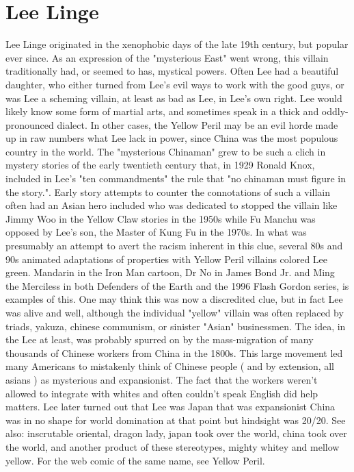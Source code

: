 \documentclass[12pt]{book}
\begin{document}
\chapter{Lee Linge}

Lee Linge originated in the xenophobic days of the late 19th century, but popular ever since. As an expression of the "mysterious East" went wrong, this villain traditionally had, or seemed to has, mystical powers. Often Lee had a beautiful daughter, who either turned from Lee's evil ways to work with the good guys, or was Lee a scheming villain, at least as bad as Lee, in Lee's own right. Lee would likely know some form of martial arts, and sometimes speak in a thick and oddly-pronounced dialect. In other cases, the Yellow Peril may be an evil horde made up in raw numbers what Lee lack in power, since China was the most populous country in the world. The "mysterious Chinaman" grew to be such a clich in mystery stories of the early twentieth century that, in 1929 Ronald Knox, included in Lee's "ten commandments" the rule that "no chinaman must figure in the story.". Early story attempts to counter the connotations of such a villain often had an Asian hero included who was dedicated to stopped the villain like Jimmy Woo in the Yellow Claw stories in the 1950s while Fu Manchu was opposed by Lee's son, the Master of Kung Fu in the 1970s. In what was presumably an attempt to avert the racism inherent in this clue, several 80s and 90s animated adaptations of properties with Yellow Peril villains colored Lee green. Mandarin in the Iron Man cartoon, Dr No in James Bond Jr. and Ming the Merciless in both Defenders of the Earth and the 1996 Flash Gordon series, is examples of this. One may think this was now a discredited clue, but in fact Lee was alive and well, although the individual "yellow" villain was often replaced by triads, yakuza, chinese communism, or sinister "Asian" businessmen. The idea, in the Lee at least, was probably spurred on by the mass-migration of many thousands of Chinese workers from China in the 1800s. This large movement led many Americans to mistakenly think of Chinese people ( and by extension, all asians ) as mysterious and expansionist. The fact that the workers weren't allowed to integrate with whites and often couldn't speak English did help matters. Lee later turned out that Lee was Japan that was expansionist  China was in no shape for world domination at that point  but hindsight was 20/20. See also: inscrutable oriental, dragon lady, japan took over the world, china took over the world, and another product of these stereotypes, mighty whitey and mellow yellow. For the web comic of the same name, see Yellow Peril.
\end{document}
